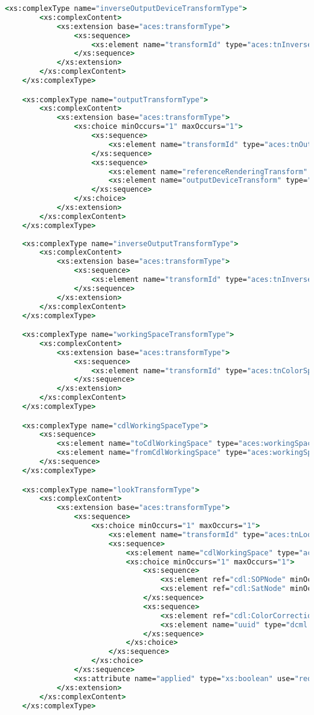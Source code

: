 \begin{lstlisting}[language=csh]
	<xs:complexType name="inverseOutputDeviceTransformType">
		<xs:complexContent>
			<xs:extension base="aces:transformType">
				<xs:sequence>
					<xs:element name="transformId" type="aces:tnInverseOutputDeviceTransform" minOccurs="1" maxOccurs="1"/>
				</xs:sequence>
			</xs:extension>
		</xs:complexContent>
	</xs:complexType>

	<xs:complexType name="outputTransformType">
		<xs:complexContent>
			<xs:extension base="aces:transformType">
				<xs:choice minOccurs="1" maxOccurs="1">
					<xs:sequence>
						<xs:element name="transformId" type="aces:tnOutputTransform" minOccurs="1" maxOccurs="1"/>
					</xs:sequence>
					<xs:sequence>
						<xs:element name="referenceRenderingTransform" type="aces:referenceRenderingTransformType" minOccurs="1" maxOccurs="1"/>
						<xs:element name="outputDeviceTransform" type="aces:outputDeviceTransformType" minOccurs="1" maxOccurs="1"/>
					</xs:sequence>
				</xs:choice>
			</xs:extension>
		</xs:complexContent>
	</xs:complexType>
	
	<xs:complexType name="inverseOutputTransformType">
		<xs:complexContent>
			<xs:extension base="aces:transformType">
				<xs:sequence>
					<xs:element name="transformId" type="aces:tnInverseOutputTransform" minOccurs="1" maxOccurs="1"/>
				</xs:sequence>
			</xs:extension>
		</xs:complexContent>
	</xs:complexType>

	<xs:complexType name="workingSpaceTransformType">
		<xs:complexContent>
			<xs:extension base="aces:transformType">
				<xs:sequence>
					<xs:element name="transformId" type="aces:tnColorSpaceConversionTransform" minOccurs="1" maxOccurs="1"/>
				</xs:sequence>
			</xs:extension>
		</xs:complexContent>
	</xs:complexType>

	<xs:complexType name="cdlWorkingSpaceType">
		<xs:sequence>
			<xs:element name="toCdlWorkingSpace" type="aces:workingSpaceTransformType" minOccurs="0" maxOccurs="1"/>
			<xs:element name="fromCdlWorkingSpace" type="aces:workingSpaceTransformType" minOccurs="1" maxOccurs="1"/>
		</xs:sequence>
	</xs:complexType>

	<xs:complexType name="lookTransformType">
		<xs:complexContent>
			<xs:extension base="aces:transformType">
				<xs:sequence>
					<xs:choice minOccurs="1" maxOccurs="1">
						<xs:element name="transformId" type="aces:tnLookTransform" minOccurs="1" maxOccurs="1"/>
						<xs:sequence>
							<xs:element name="cdlWorkingSpace" type="aces:cdlWorkingSpaceType" minOccurs="1" maxOccurs="1"/>
							<xs:choice minOccurs="1" maxOccurs="1">
								<xs:sequence>
									<xs:element ref="cdl:SOPNode" minOccurs="1" maxOccurs="1"/>
									<xs:element ref="cdl:SatNode" minOccurs="1" maxOccurs="1"/>
								</xs:sequence>
								<xs:sequence>
									<xs:element ref="cdl:ColorCorrectionRef"/>
									<xs:element name="uuid" type="dcml:UUIDType" minOccurs="0" maxOccurs="1"/>
								</xs:sequence>
							</xs:choice>
						</xs:sequence>
					</xs:choice>
				</xs:sequence>
				<xs:attribute name="applied" type="xs:boolean" use="required"/>
			</xs:extension>
		</xs:complexContent>
	</xs:complexType>


\end{lstlisting}
